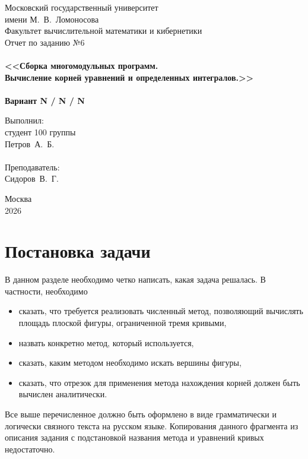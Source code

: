 \documentclass[a4paper,12pt,titlepage,finall]{article}
\begin{document}
\begin{titlepage}
    \begin{center}
	{\small \sc Московский государственный университет \\имени М.~В.~Ломоносова\\
	Факультет вычислительной математики и кибернетики\\}
	\vfill
	{\Large \sc Отчет по заданию №6}\\
	~\\
	{\large \bf <<Сборка многомодульных программ. \\
	Вычисление корней уравнений и определенных интегралов.>>}\\ 
	~\\
	{\large \bf Вариант N / N / N}
    \end{center}
    \begin{flushright}
	\vfill {Выполнил:\\
	студент 100 группы\\
	Петров~А.~Б.\\
	~\\
	Преподаватель:\\
	Сидоров~В.~Г.}
    \end{flushright}
    \begin{center}
	\vfill
	{\small Москва\\2026}
    \end{center}
\end{titlepage}

\tableofcontents
\newpage

\section{Постановка задачи}

В данном разделе необходимо четко написать, какая задача решалась. В частности, необходимо
\begin{itemize}
\item сказать, что требуется реализовать численный метод, позволяющий вычислять площадь плоской фигуры,
	ограниченной тремя кривыми,
\item назвать конкретно метод, который используется,
\item сказать, каким методом необходимо искать вершины фигуры,
\item сказать, что отрезок для применения метода нахождения корней должен быть вычислен аналитически.
\end{itemize}
Все выше перечисленное должно быть оформлено в виде грамматически и логически
связного текста на русском языке. Копирования данного фрагмента из описания задания 
с подстановкой названия метода и уравнений кривых недостаточно.
\end{document}
